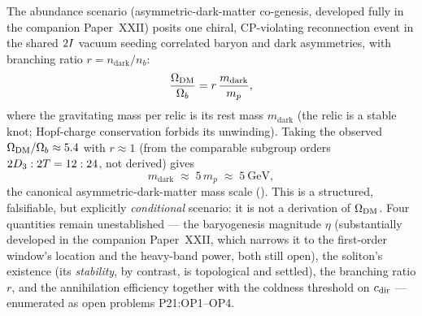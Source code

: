 The abundance scenario (asymmetric-dark-matter co-genesis, developed
fully in the companion Paper~XXII) posits one chiral, CP-violating
reconnection event in the shared $2I$ vacuum seeding correlated
baryon and dark asymmetries, with branching ratio $r=n_{\mathrm{dark}}/n_b$:
\begin{equation}
  \frac{\Omega_{\mathrm{DM}}}{\Omega_{b}}=r\,\frac{m_{\mathrm{dark}}}{m_p},
  \label{P21:eq:adm}
\end{equation}
where the gravitating mass per relic is its rest mass $m_{\mathrm{dark}}$
(the relic is a stable knot; Hopf-charge conservation forbids its
unwinding). Taking the observed $\Omega_{\mathrm{DM}}/\Omega_{b}\approx5.4$ with $r\approx1$
(from the comparable subgroup orders $2D_3:2T=12:24$, not derived)
gives
\begin{equation}
  m_{\mathrm{dark}} \;\approx\; 5\,m_p \;\approx\; 5~\mathrm{GeV},
\end{equation}
the canonical asymmetric-dark-matter mass scale
(). This is a structured,
falsifiable, but explicitly \emph{conditional} scenario: it is not a
derivation of $\Omega_{\mathrm{DM}}$. Four quantities remain unestablished --- the
baryogenesis magnitude $\eta$ (substantially developed in the companion
Paper~XXII, which narrows it to the first-order window's location and
the heavy-band power, both still open), the soliton's existence (its
\emph{stability}, by contrast, is topological and settled), the
branching ratio $r$, and the annihilation efficiency together with the
coldness threshold on $c_{\mathrm{dir}}$ --- enumerated as open problems
P21:OP1--OP4.
